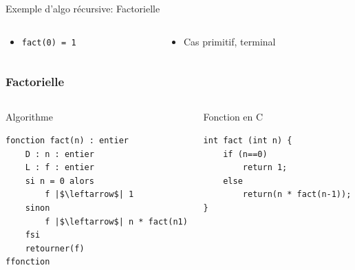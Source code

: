 \documentclass[table,handout,tikz,12pt,svgnames]{beamer}
\begin{document}
\begin{frame}[fragile=singleslide]
\begin{block}{}
\begin{itemize}
\begin{block}{Exemple d'algo récursive: Factorielle}
\begin{columns}[c]
\begin{column}{0.55\textwidth}
\begin{itemize}
							\item \texttt{fact(0) = 1}
						\end{itemize}
					\end{column}
					\hspace{-0.3cm}
					\vrule{}
					\hspace{0cm}	
					\begin{column}{0.45\textwidth}
						\begin{itemize}
							\item Cas primitif, terminal
						\end{itemize}
				    \end{column}
				\end{columns}
				\end{block}					
			\end{itemize}
		\end{block}
\end{frame}

\begin{frame}[fragile=singleslide]
	\frametitle{Factorielle}
				\begin{columns}[T]
				  	\hspace{-0.3cm}
				  	\begin{column}{0.5\textwidth}
				  	\begin{block}{Algorithme}
						\begin{verbatim}
fonction fact(n) : entier
	D : n : entier
	L : f : entier
	si n = 0 alors 
		f |$\leftarrow$| 1
	sinon
		f |$\leftarrow$| n * fact(n­1)
	fsi
	retourner(f)
ffonction
						\end{verbatim}		
					\end{block}			
					\end{column}
					\vrule{}
				  	\begin{column}{0.55\textwidth}
				  	\begin{block}{Fonction en C}
						\begin{verbatim}
int fact (int n) {
	if (n==0)
		return 1;
	else
		return(n * fact(n-1));
}
						\end{verbatim}					
					\end{block}	
					\end{column}
				\end{columns}
\end{frame}
\end{document}
